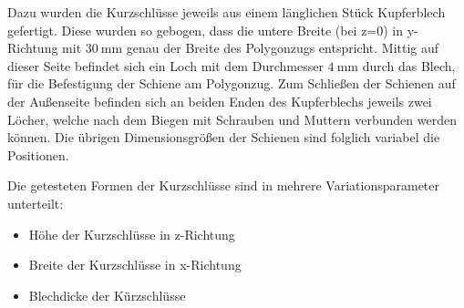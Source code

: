 Dazu wurden die Kurzschl\"usse jeweils aus einem l\"anglichen St\"uck Kupferblech gefertigt. Diese wurden so gebogen, dass die untere Breite (bei z=0) in y-Richtung mit $\SI{30}{\milli\meter}$ genau der Breite des Polygonzugs entspricht. Mittig auf dieser Seite befindet sich ein Loch mit dem Durchmesser $\SI{4}{\milli\meter}$ durch das Blech, für die Befestigung der Schiene am Polygonzug. Zum Schlie\ss{}en der Schienen auf der Au\ss{}enseite befinden sich an beiden Enden des Kupferblechs jeweils zwei L\"ocher, welche nach dem Biegen mit Schrauben und Muttern verbunden werden k\"onnen. Die \"ubrigen Dimensionsgr\"o\ss{}en der Schienen sind folglich variabel die Positionen.
\par
Die getesteten Formen der Kurzschl\"usse sind in mehrere Variationsparameter unterteilt:
\begin{itemize}
	\item H\"ohe der Kurzschl\"usse in z-Richtung
	\item Breite der Kurzschl\"usse in x-Richtung
	\item Blechdicke der K\"urzschl\"usse
\end{itemize}


\newpage




